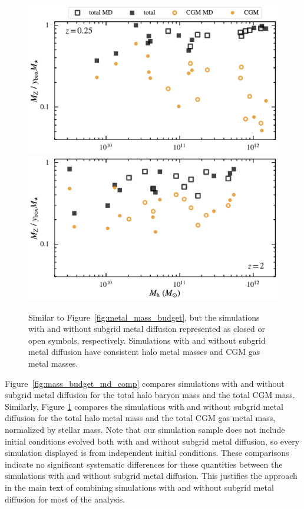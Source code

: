 \documentclass[fleqn,usenatbib]{mnras}
\begin{document}
\begin{figure}
\includegraphics[width=\columnwidth]{figures/metal_mass_budget_snum465_md_comp.pdf}
\includegraphics[width=\columnwidth]{figures/metal_mass_budget_snum172_md_comp.pdf}
\caption{
Similar to Figure~\ref{fig:metal_mass_budget}, but the simulations with and without subgrid metal diffusion represented as closed or open symbols, respectively.
Simulations with and without subgrid metal diffusion have consistent halo metal masses and CGM gas metal masses.
}
\label{fig:metal_mass_budget_md_comp}
\end{figure}

Figure~\ref{fig:mass_budget_md_comp} compares simulations with and without subgrid metal diffusion for the total halo baryon mass and the total CGM mass.
Similarly, Figure \ref{fig:metal_mass_budget_md_comp} compares the simulations with and without subgrid metal diffusion for the total halo metal mass and the total CGM gas metal mass, normalized by stellar mass. 
Note that our simulation sample does not include initial conditions evolved both with and without subgrid metal diffusion, so every simulation displayed is from independent initial conditions.
These comparisons indicate no significant systematic differences for these quantities between the simulations with and without subgrid metal diffusion.
This justifies the approach in the main text of combining simulations with and without subgrid metal diffusion for most of the analysis.
\end{document}
